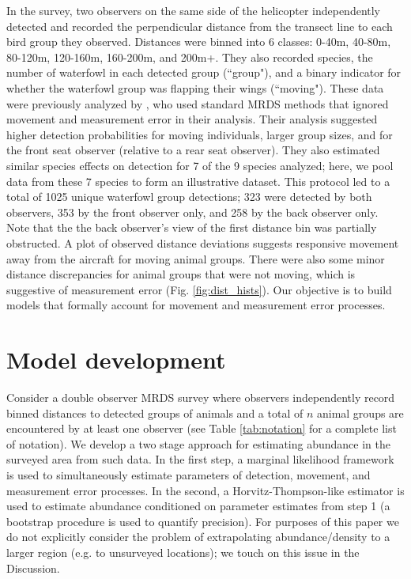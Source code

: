 \documentclass[12pt,fleqn]{article}
\begin{document}
In the survey, two observers on the same side of the helicopter independently detected and recorded the perpendicular distance from the transect line to each bird group they observed.  Distances were binned into 6 classes: 0-40m, 40-80m, 80-120m, 120-160m, 160-200m, and 200m+.  They also recorded species, the number of waterfowl in each detected group (``group"), and a binary indicator for whether the waterfowl group was flapping their wings (``moving").  These data were previously analyzed by \citet{AlisauskasConn2017}, who used standard MRDS methods that ignored movement and measurement error in their analysis.  Their analysis suggested higher detection probabilities for moving individuals, larger group sizes, and for the front seat observer (relative to a rear seat observer).  They also estimated similar species effects on detection for 7 of the 9 species analyzed; here, we pool data from these 7 species to form an illustrative dataset.  This protocol led to a total of 1025 unique waterfowl group detections; 323 were detected by both observers, 353 by the front observer only, and 258 by the back observer only.  Note that the the back observer's view of the first distance bin was partially obstructed.  A plot of observed distance deviations suggests responsive movement away from the aircraft for moving animal groups.  There were also some minor distance discrepancies for animal groups that were not moving, which is suggestive of measurement error (Fig. \ref{fig:dist_hists}).  Our objective is to build models that formally account for movement and measurement error processes.

\section{Model development}


Consider a double observer MRDS survey where observers independently record binned distances to detected groups of animals and a total of $n$ animal groups are encountered by at least one observer (see Table \ref{tab:notation} for a complete list of notation).  We develop a two stage approach for estimating abundance in the surveyed area from such data.  In the first step, a marginal likelihood framework is used to simultaneously estimate parameters of detection, movement, and measurement error processes.  In the second, a Horvitz-Thompson-like estimator is used to estimate abundance conditioned on parameter estimates from step 1 (a bootstrap procedure is used to quantify precision).  For purposes of this paper we do not explicitly consider the problem of extrapolating abundance/density to a larger region (e.g. to unsurveyed locations); we touch on this issue in the Discussion.
\end{document}
